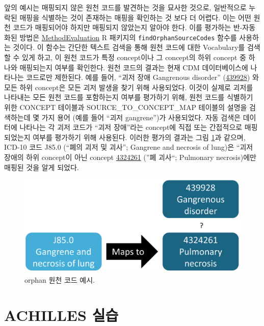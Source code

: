 \documentclass[10.5pt]{book}
\theoremstyle{definition}
\theoremstyle{definition}
\theoremstyle{definition}
\theoremstyle{remark}
\begin{document}
앞의 예시는 매핑되지 않은 원천 코드를 발견하는 것을 묘사한 것으로,
일반적으로 누락된 매핑을 식별하는 것이 존재하는 매핑을 확인하는 것 보다
더 어렵다. 이는 어떤 원천 코드가 매핑되어야 하지만 매핑되지 않았는지
알아야 한다. 이를 평가하는 반-자동화된 방법은
\href{https://ohdsi.github.io/MethodEvaluation/}{MethodEvaluation} R
패키지의 \texttt{findOrphanSourceCodes} 함수를 사용하는 것이다. 이
함수는 간단한 텍스트 검색을 통해 원천 코드에 대한 Vocabulary를 검색할 수
있게 하고, 이 원천 코드가 특정 concept이나 그 concept의 하위 concept 중
하나와 매핑되는지 여부를 확인한다. 원천 코드의 결과는 현재 CDM
데이터베이스에 나타나는 코드로만 제한된다. 예를 들어, ``괴저 장애
Gangrenous disorder''
(\href{http://athena.ohdsi.org/search-terms/terms/439928}{439928}) 와
모든 하위 concept은 모든 괴저 발생을 찾기 위해 사용되었다. 이것이 실제로
괴저를 나타내는 모든 원천 코드를 포함하는지 여부를 평가하기 위해, 원천
코드를 식별하기 위한 CONCEPT 테이블과 SOURCE\_TO\_CONCEPT\_MAP 테이블의
설명을 검색하는데 몇 가지 용어 (예를 들어 ``괴저 gangrene'')가
사용되었다. 자동 검색은 데이터에 나타나는 각 괴저 코드가 ``괴저
장애''라는 concept에 직접 또는 간접적으로 매핑되었는지 여부를 평가하기
위해 사용된다. 이러한 평가의 결과는 그림 \ref{fig:missingMapping}과
같으며, ICD-10 코드 J85.0 (``폐의 괴저 및 괴사''; Gangrene and necrosis
of lung)은 ``괴저 장애의 하위 concept이 아닌 concept
\href{http://athena.ohdsi.org/search-terms/terms/4324261}{4324261} (''폐
괴사``; Pulmonary necrosis)에만 매핑된 것을 알게 되었다.

\begin{figure}

{\centering \includegraphics[width=0.7\linewidth]{images/DataQuality/missingMapping} 

}

\caption{orphan 원천 코드 예시. }\label{fig:missingMapping}
\end{figure}

\section{ACHILLES 실습}\label{achillesInPractice}
\end{document}
